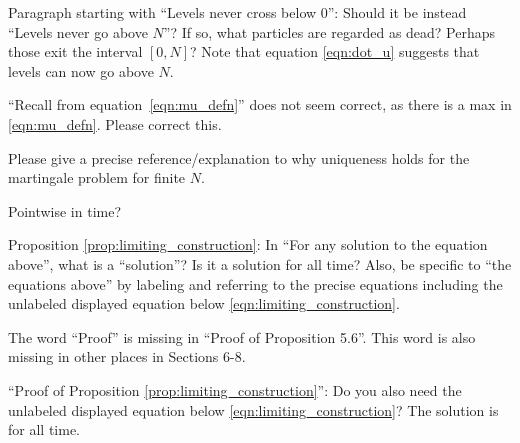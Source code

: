 \reply{
}

\begin{point}{\revref}
Paragraph starting with ``Levels never cross below 0'': Should it be instead ``Levels never
go above $N$''? If so, what particles are regarded as dead? Perhaps those exit the interval
$[0, N]$? Note that equation \eqref{eqn:dot_u} suggests that levels can now go above $N$.
\end{point}

\reply{
}

\begin{point}{\revref}
``Recall from equation~\eqref{eqn:mu_defn}''
does not seem correct, as there is a max in \eqref{eqn:mu_defn}. Please
correct this.
\end{point}

\reply{
}

\begin{point}{\revref}
Please give a precise reference/explanation to why uniqueness holds for the martingale problem for finite $N$.
\end{point}

\reply{
}

\begin{point}{\revref}
    Pointwise in time?
\end{point}

\reply{
}

\begin{point}{\revref}
Proposition \ref{prop:limiting_construction}: In ``For any solution to the equation above'', what is a ``solution''? Is it
a solution for all time? Also, be specific to ``the equations above'' by labeling and referring
to the precise equations including the unlabeled displayed equation below \eqref{eqn:limiting_construction}.
\end{point}

\reply{
}

\begin{point}{\revref}
The word ``Proof'' is missing in ``Proof of Proposition 5.6''. This word is also
missing in other places in Sections 6-8.
\end{point}

\reply{
}

\begin{point}{}
``Proof of Proposition \ref{prop:limiting_construction}'': Do you also need the unlabeled displayed equation below
\eqref{eqn:limiting_construction}? The solution is for all time.
\end{point}


